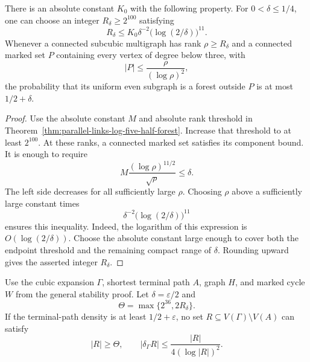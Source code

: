 \begin{lemma}
\label{lem:path-polynomial-local-threshold}
There is an absolute constant $K_0$ with the following property.
For $0<\delta\le1/4$, one can choose an integer $R_\delta\ge2^{100}$ satisfying
\[
 R_\delta\le K_0\delta^{-2}\bigl(\log(2/\delta)\bigr)^{11}.
\]
Whenever a connected subcubic multigraph has rank $\rho\ge R_\delta$ and a connected marked set $P$ containing every vertex of degree below three, with
\[
 |P|\le\frac{\rho}{(\log\rho)^2},
\]
the probability that its uniform even subgraph is a forest outside $P$ is at most $1/2+\delta$.
\end{lemma}

\begin{proof}
Use the absolute constant $M$ and absolute rank threshold in Theorem~\ref{thm:parallel-links-log-five-half-forest}.
Increase that threshold to at least $2^{100}$.
At these ranks, a connected marked set satisfies its component bound.
It is enough to require
\[
 M\frac{(\log\rho)^{11/2}}{\sqrt\rho}\le\delta.
\]
The left side decreases for all sufficiently large $\rho$.
Choosing $\rho$ above a sufficiently large constant times
\[
 \delta^{-2}\bigl(\log(2/\delta)\bigr)^{11}
\]
ensures this inequality.
Indeed, the logarithm of this expression is $O(\log(2/\delta))$.
Choose the absolute constant large enough to cover both the endpoint threshold and the remaining compact range of $\delta$.
Rounding upward gives the asserted integer $R_\delta$.
\end{proof}

\begin{lemma}
\label{lem:path-direct-good-set}
Use the cubic expansion $\Gamma$, shortest terminal path $A$, graph $H$, and marked cycle $W$ from the general stability proof.
Let $\delta=\varepsilon/2$ and
\[
 \Theta=\max\{2^{36},2R_\delta\}.
\]
If the terminal-path density is at least $1/2+\varepsilon$, no set $R\subseteq V(\Gamma)\setminus V(A)$ can satisfy
\[
 |R|\ge\Theta,
 \qquad
 |\delta_\Gamma R|\le\frac{|R|}{4(\log|R|)^2}.
\]
\end{lemma}

